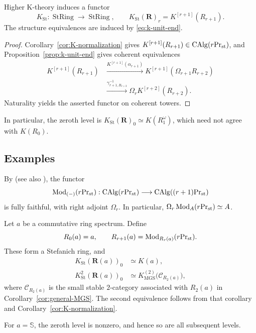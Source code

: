 \begin{theorem}\label{thm:stefanich-k}
Higher K-theory induces a functor
\[
 K_{\mathrm{St}}:
 \operatorname{StRing}\longrightarrow
 \operatorname{StRing},
 \qquad
 K_{\mathrm{St}}(\mathbf R)_r
 =K^{[r+1]}(R_{r+1}).
\]
The structure equivalences are induced by
\eqref{eq:k-unit-end}.
\end{theorem}

\begin{proof}
Corollary~\ref{cor:K-normalization} gives
$K^{[r+1]}(R_{r+1})\in\operatorname{CAlg}({r}\mathrm{Pr}_{\mathrm{st}})$, and
Proposition~\ref{prop:k-unit-end} gives
coherent equivalences
\[
 \begin{aligned}
 K^{[r+1]}(R_{r+1})
 &\xrightarrow{K^{[r+1]}(\alpha_{r+1})}
 K^{[r+1]}(\Omega_{r+1}R_{r+2})\\
 &\xrightarrow{\gamma_{r+1,R_{r+2}}^{-1}}
 \Omega_r K^{[r+2]}(R_{r+2}).
 \end{aligned}
\]
Naturality yields the asserted functor
on coherent towers.
\end{proof}

In particular, the zeroth level is
\(K_{\mathrm{St}}(\mathbf R)_0
 \simeq K(R_1^\omega)\),
which need not agree with $K(R_0)$.

\subsection{Examples}

By \citep[Lemma~2.11]{Aoki}
(see also \citep[Theorem~3.11]{ScholzeGeometry}),
the functor
\[
 \operatorname{Mod}_{(-)}({r}\mathrm{Pr}_{\mathrm{st}}):
 \operatorname{CAlg}({r}\mathrm{Pr}_{\mathrm{st}})\longrightarrow
 \operatorname{CAlg}({(r+1)}\mathrm{Pr}_{\mathrm{st}})
\]
is fully faithful, with right adjoint $\Omega_r$.
In particular, \(\Omega_r\operatorname{Mod}_A({r}\mathrm{Pr}_{\mathrm{st}})\simeq A\).




\begin{example}\label{ex:module-stefanich-k}
Let $a$ be a commutative ring spectrum. Define
\[
 R_0(a)=a,\qquad
 R_{r+1}(a)=\operatorname{Mod}_{R_r(a)}({r}\mathrm{Pr}_{\mathrm{st}}).
\]
These form a Stefanich ring, and
\[
 \begin{aligned}
 K_{\mathrm{St}}(\mathbf R(a))_0
   &\simeq K(a),\\
 K_{\mathrm{St}}^2(\mathbf R(a))_0
   &\simeq
   K_{\mathrm{MGS}}^{(2)}
     \bigl(\mathcal C_{R_2(a)}\bigr),
 \end{aligned}
\]
where $\mathcal C_{R_2(a)}$ is the small stable
$2$-category associated with $R_2(a)$ in
Corollary~\ref{cor:general-MGS}.
The second equivalence follows from that corollary
and Corollary~\ref{cor:K-normalization}.

For $a=\mathbb S$, the zeroth level is nonzero,
and hence so are all subsequent levels.
\end{example}


